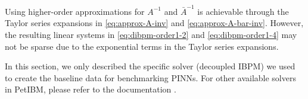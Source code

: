 Using higher-order approximations for $A^{-1}$ and $\bar{A}^{-1}$ is achievable through the Taylor series expansions in \eqref{eq:approx-A-inv} and \eqref{eq:approx-A-bar-inv}.
However, the resulting linear systems in \eqref{eq:dibpm-order1-2} and \eqref{eq:dibpm-order1-4} may not be sparse due to the exponential terms in the Taylor series expansions.

In this section, we only described the specific solver (decoupled IBPM) we used to create the baseline data for benchmarking PINNs.
For other available solvers in PetIBM, please refer to the documentation \cite{chuang_petibm:_2018}.
